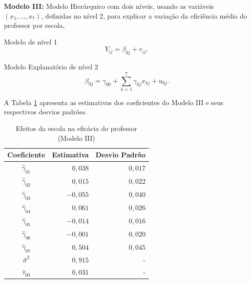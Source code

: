 \documentclass[]{book}
\numberwithin{example}{chapter}
\numberwithin{remark}{chapter}
\numberwithin{definition}{chapter}
\begin{document}
\textbf{Modelo III:} Modelo Hierárquico com dois níveis, usando as
variáveis \(\left( x_{1},\ldots ,x_{7}\right)\), definidas no nível 2,
para explicar a variação da eficiência média do professor por
escola\textbf{.}

Modelo de nível 1 \[
Y_{ij}=\beta _{0j}+r_{ij},
\]

Modelo Explanatório de nível 2 \[
\beta _{0j}=\gamma _{00}+\sum\limits_{k=1}^{7}\gamma _{0j}x_{kj}+u_{0j}.
\]

A Tabela \ref{tab96} apresenta as estimativas dos coeficientes do Modelo
III e seus respectivos desvios padrões.

\begin{center}
\begin{table}[tbp] \centering%
\caption{Efeitos da escola na eficácia do professor (Modelo III)}\bigskip
\label{tab96}
\begin{tabular}{|c|c|c|}
\hline\hline
Coeficiente & Estimativa & Desvio Padrão \\ \hline\hline
$\hat{\gamma}_{01}$ & \multicolumn{1}{|r|}{$0,038$} & \multicolumn{1}{|r|}{$%
0,017$} \\
$\hat{\gamma}_{02}$ & \multicolumn{1}{|r|}{$0,015$} & \multicolumn{1}{|r|}{$%
0,022$} \\
$\hat{\gamma}_{03}$ & \multicolumn{1}{|r|}{$-0,055$} & \multicolumn{1}{|r|}{$%
0,040$} \\
$\hat{\gamma}_{04}$ & \multicolumn{1}{|r|}{$0,061$} & \multicolumn{1}{|r|}{$%
0,026$} \\
$\hat{\gamma}_{05}$ & \multicolumn{1}{|r|}{$-0,014$} & \multicolumn{1}{|r|}{$%
0,016$} \\
$\hat{\gamma}_{06}$ & \multicolumn{1}{|r|}{$-0,001$} & \multicolumn{1}{|r|}{$%
0,020$} \\
$\hat{\gamma}_{07}$ & \multicolumn{1}{|r|}{$0,504$} & \multicolumn{1}{|r|}{$%
0,045$} \\
$\hat{\sigma}^{2}$ & \multicolumn{1}{|r|}{$0,915$} & \multicolumn{1}{|r|}{-}
\\
$\hat{\tau}_{00}$ & \multicolumn{1}{|r|}{$0,031$} & \multicolumn{1}{|r|}{-}
\\ \hline\hline
\end{tabular}
\end{table}%
\end{center}
\end{document}
